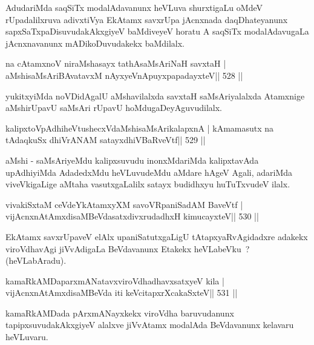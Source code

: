 \begin{artha}
AdudariMda saqSiTx modalAdavanunx heVLuva shurxtigaLu oMdeV rUpadalilxruva adivxtiVya EkAtamx savxrUpa jAcnxnada daqDhateyanunx sapxSaTxpaDisuvudakAkxgiyeV baMdiveyeV horatu A saqSiTx modalAdavugaLa jAcnxnavanunx mADikoDuvudakekx baMdilalx.
\end{artha}


\begin{shl}
na cA\s\s tamxnoV niraMshasayx tathA\s saMsAriNaH savxtaH |
aMshisaMsAriBAvatavxM nAyxyeVnApuyxpapadayxteV\hfill || 528 ||
\end{shl}

\begin{artha}
yukitxyiMda noVDidAgalU aMshavilalxda savxtaH saMsAriyalalxda Atamxnige aMshirUpavU saMsAri rUpavU hoMdugaDeyAguvudilalx.
\end{artha}

\begin{shl}
kalipxtoVpAdhiheVtushecxVdaMshisaMsArikalapxnA |
kAmamasutx na tAdaqkuSx dhiVrANAM satayxdhiVBaRveVtf\hfill || 529 ||
\end{shl}

\begin{artha}
aMshi - saMsAriyeMdu kalipxsuvudu inonxMdariMda kalipxtavAda upAdhiyiMda AdadedxMdu heVLuvudeMdu aMdare hAgeV Agali, adariMda viveVkigaLige aMtaha vasutxgaLalilx satayx budidhxyu huTuTxvudeV ilalx.
\end{artha}

\begin{shl}
vivakiSxtaM ceVdeYkAtamxyXM savoVRpaniSadAM BaveVtf |
vijAcnxnAtAmxdisaMBeVdasatxdivxrudadhxH kimucayxteV\hfill || 530 ||
\end{shl}

\begin{artha}
EkAtamx savxrUpaveV elAlx upaniSatutxgaLigU tAtapxyaRvAgidadxre adakekx viroVdhavAgi jiVvAdigaLa BeVdavanunx Etakekx heVLabeVku~? (heVLabAradu).
\end{artha}


\begin{shl}
kamaRkAMDaparxmANatavxviroVdhadhavxsatxyeV kila |
vijAcnxnAtAmxdisaMBeVda iti keVcitapxrXcakaSxteV\hfill || 531 ||
\end{shl}

\begin{artha}
kamaRkAMDada pArxmANayxkekx viroVdha baruvudanunx tapipxsuvudakAkxgiyeV alalxve jiVvAtamx modalAda BeVdavanunx kelavaru heVLuvaru.
\end{artha}

